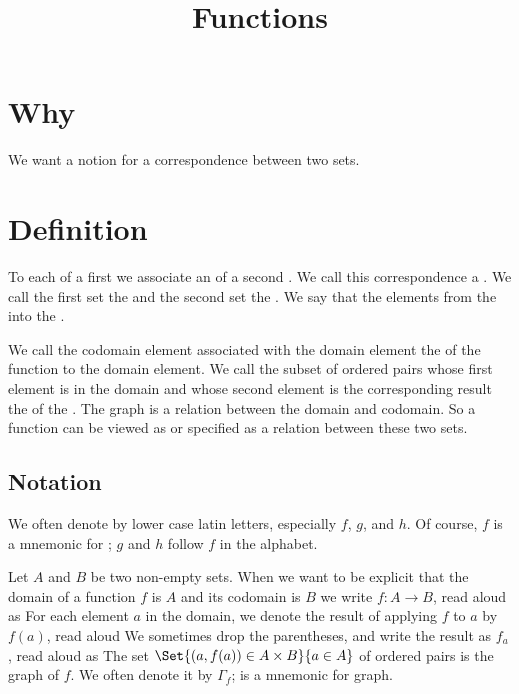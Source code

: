






\title{Functions}

\section{Why}
We want a notion for a correspondence between two sets.

\section{Definition}

To each  of a first  we associate an  of a second .
We call this correspondence a .
We call the first set the  and the second set the .
We say that the   elements from the  into the .

We call the codomain element associated with the domain element the  of  the function to the domain element.
We call the subset of ordered pairs whose first element is in the domain and whose second element is the corresponding result the  of the .
The graph is a relation between the domain and codomain.
So a function can be viewed as or specified as a relation between these two sets.

\subsection{Notation}
We often denote  by lower case latin letters, especially $f$, $g$, and $h$.
Of course, $f$ is a mnemonic for ; $g$ and $h$ follow $f$ in the alphabet.

Let $A$ and $B$ be two non-empty sets.
When we want to be explicit that the domain of a function $f$ is $A$ and its codomain is $B$ we write $f: A \to B$, read aloud as 
For each element $a$ in the domain, we denote the result of applying $f$ to $a$ by $f(a)$, read aloud 
We sometimes drop the parentheses, and write the result as $f_a$, read aloud as 
The set $\Set{(a, f(a)) \in A \cross B}{a \in A}$ of ordered pairs is the graph of $f$.
We often denote it by $\Gamma_f$;  is a mnemonic for graph.

